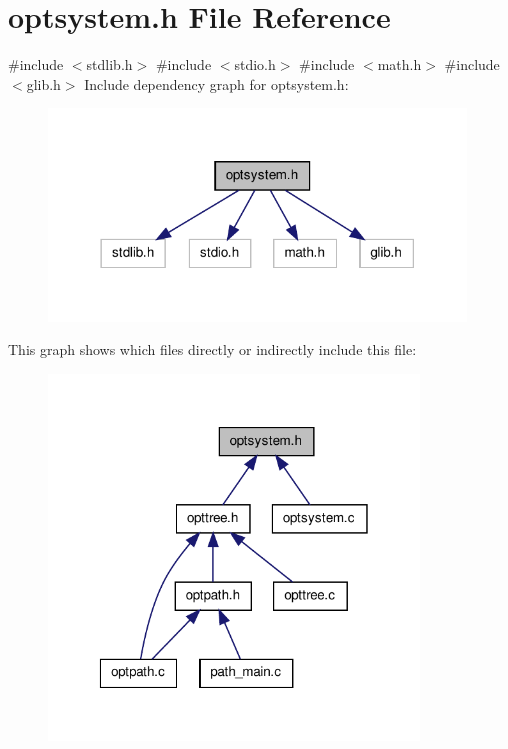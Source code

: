 \hypertarget{a00018}{\section{optsystem.\-h \-File \-Reference}
\label{d1/d2b/a00018}
}
{\ttfamily \#include $<$stdlib.\-h$>$}\*
{\ttfamily \#include $<$stdio.\-h$>$}\*
{\ttfamily \#include $<$math.\-h$>$}\*
{\ttfamily \#include $<$glib.\-h$>$}\*
\-Include dependency graph for optsystem.\-h\-:
\nopagebreak
\begin{figure}[H]
\begin{center}
\leavevmode
\includegraphics[width=314pt]{d5/d16/a00029}
\end{center}
\end{figure}
\-This graph shows which files directly or indirectly include this file\-:
\nopagebreak
\begin{figure}[H]
\begin{center}
\leavevmode
\includegraphics[width=279pt]{d5/d79/a00030}
\end{center}
\end{figure}

